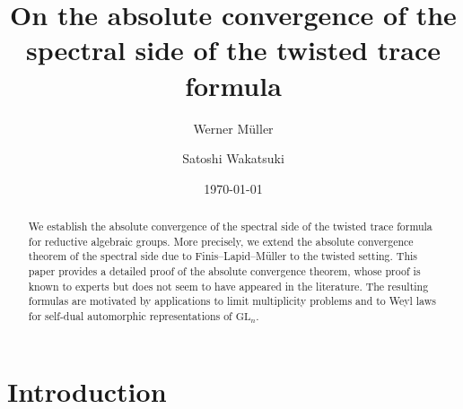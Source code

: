 \documentclass[12pt]{amsart}
\theoremstyle{definition}
\theoremstyle{plain}
\theoremstyle{remark}
\def\GL{\mathrm{GL}}
\numberwithin{equation}{section}
\begin{document}
\title{On the absolute convergence of the spectral side of the twisted trace formula}

\author{Werner M\"uller}
\address{Universit\"at Bonn, Mathematisches Institut, Endenicher Allee 60, D-53115 Bonn, Germany}

\author{Satoshi Wakatsuki}
\address{Faculty of Mathematics and Physics, Institute of Science and Engineering, Kanazawa University, Kakumamachi, Kanazawa, Ishikawa, 920-1192, Japan}


\date{\today}

\begin{abstract}
We establish the absolute convergence of the spectral side of the twisted trace formula for reductive algebraic groups. 
More precisely, we extend the absolute convergence theorem of the spectral side due to Finis--Lapid--M\"uller \cite{FLM11} to the twisted setting. 
This paper provides a detailed proof of the absolute convergence theorem, whose proof is known to experts but does not seem to have appeared in the literature.
The resulting formulas are motivated by applications to limit multiplicity problems and to Weyl laws for self-dual automorphic representations of $\GL_n$.
\end{abstract}

\maketitle

\tableofcontents

\section{Introduction}\label{sec:intro}
\end{document}
